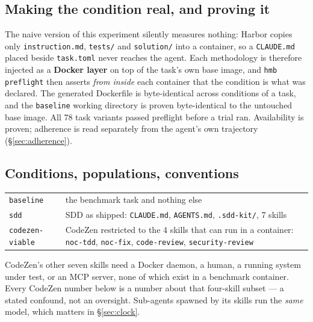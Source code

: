 \documentclass[11pt,a4paper]{article}
\newcommand{\code}[1]{\texttt{\small #1}}
\begin{document}
\subsection{Making the condition real, and proving it}

The naive version of this experiment silently measures nothing: Harbor copies only
\code{instruction.md}, \code{tests/} and \code{solution/} into a container, so a
\code{CLAUDE.md} placed beside \code{task.toml} never reaches the agent. Each methodology is
therefore injected as a \textbf{Docker layer} on top of the task's own base image, and
\code{hmb preflight} then asserts \emph{from inside} each container that the condition is what
was declared. The generated Dockerfile is byte-identical across conditions of a task, and the
\code{baseline} working directory is proven byte-identical to the untouched base image. All 78
task variants passed preflight before a trial ran. Availability is proven; adherence is read
separately from the agent's own trajectory (\S\ref{sec:adherence}).

\subsection{Conditions, populations, conventions}

\begin{center}\small
\begin{tabular}{@{}p{2.5cm}p{12.5cm}@{}}
\toprule
\code{baseline} & the benchmark task and nothing else \\
\code{sdd} & SDD as shipped: \code{CLAUDE.md}, \code{AGENTS.md}, \code{.sdd-kit/}, 7 skills \\
\code{codezen-viable} & CodeZen restricted to the 4 skills that can run in a container:
\code{noc-tdd}, \code{noc-fix}, \code{code-review}, \code{security-review} \\
\bottomrule
\end{tabular}
\end{center}

\noindent CodeZen's other seven skills need a Docker daemon, a human, a running system under
test, or an MCP server, none of which exist in a benchmark container. Every CodeZen number
below is a number about that four-skill subset --- a stated confound, not an oversight.
Sub-agents spawned by its skills run the \emph{same} model, which matters in \S\ref{sec:clock}.

\begin{table}[htbp]
\centering
\caption{The two populations. The line that matters is the second from bottom: in both runs
most of the money bought tasks on which every condition did the same thing.}
\label{tab:pop}
\small

\end{table}
\end{document}
